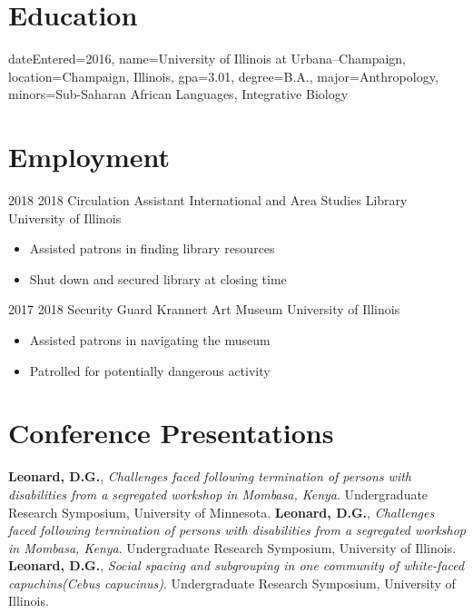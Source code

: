 \documentclass{cv}
\author{Daniel Leonard}
\begin{document}
\maketitle

\section{Education}
\secitemeducation
	{dateEntered=2016,
	name=University of Illinois at Urbana--Champaign,
	location={Champaign, Illinois},
	gpa=3.01,
	degree=B.A.,
	major=Anthropology,
	minors={Sub-Saharan African Languages, Integrative Biology}}

\section{Employment}
\secitemexperience
	{2018}
	{2018}
	{Circulation Assistant}
	{International and Area Studies Library}
	{University of Illinois}
	{
		\begin{itemize}
			\item Assisted patrons in finding library resources
			\item Shut down and secured library at closing time
		\end{itemize}
	}
\secitemexperience
	{2017}
	{2018}
	{Security Guard}
	{Krannert Art Museum}
	{University of Illinois}
	{
		\begin{itemize}
			\item Assisted patrons in navigating the museum
			\item Patrolled for potentially dangerous activity
		\end{itemize}
	}


\section{Conference Presentations}
	{{\textbf {Leonard, D.G.}}, {\textit {Challenges faced following termination of persons with disabilities from a segregated workshop in Mombasa, Kenya}}. Undergraduate Research Symposium, University of Minnesota.}
	{{\textbf {Leonard, D.G.}}, {\textit {Challenges faced following termination of persons with disabilities from a segregated workshop in Mombasa, Kenya}}. Undergraduate Research Symposium, University of Illinois.}
	{{\textbf {Leonard, D.G.}}, {\textit {Social spacing and subgrouping in one community of white-faced capuchins({{Cebus capucinus}})}}. Undergraduate Research Symposium, University of Illinois.}
\end{document}

